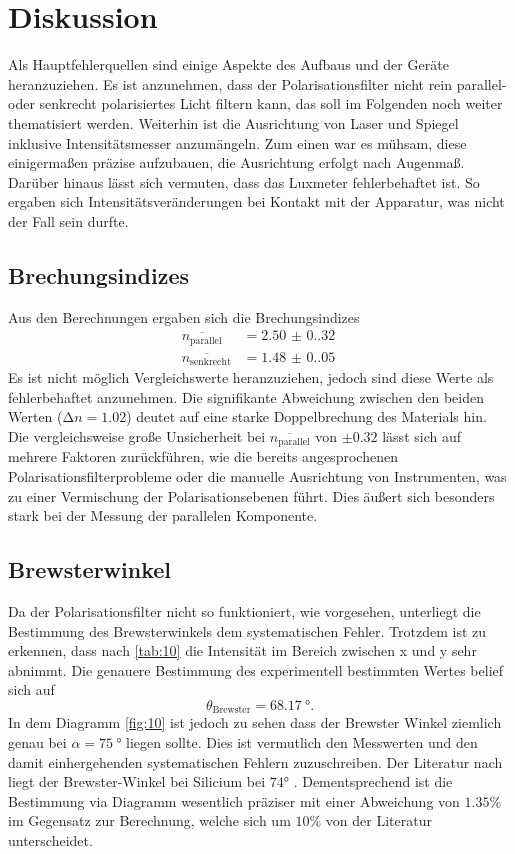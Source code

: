 \section{Diskussion}
\label{sec:Diskussion}

Als Hauptfehlerquellen sind einige Aspekte des Aufbaus und der Geräte heranzuziehen.
Es ist anzunehmen, dass der Polarisationsfilter nicht rein parallel- oder 
senkrecht polarisiertes Licht filtern kann, das soll im Folgenden noch weiter 
thematisiert werden. Weiterhin ist die Ausrichtung von Laser und Spiegel inklusive 
Intensitätsmesser anzumängeln. Zum einen war es mühsam, diese einigermaßen präzise 
aufzubauen, die Ausrichtung erfolgt nach Augenmaß. Darüber hinaus lässt sich 
vermuten, dass das Luxmeter fehlerbehaftet ist. So ergaben sich 
Intensitätsveränderungen bei Kontakt mit der Apparatur, was nicht der Fall sein 
durfte.

\subsection{Brechungsindizes}
Aus den Berechnungen ergaben sich die Brechungsindizes
\begin{align*}
    \overline{n_\text{parallel}}  &= \qty{2.50(0.32)}{} \\
    \overline{n_\text{senkrecht}} &= \qty{1.48(0.05)}{}
\end{align*}
\noindent Es ist nicht möglich Vergleichswerte heranzuziehen, jedoch sind diese 
Werte als fehlerbehaftet anzunehmen. Die signifikante Abweichung zwischen den
beiden Werten ($\increment n = 1.02$) deutet auf eine starke Doppelbrechung des
Materials hin. Die vergleichsweise große Unsicherheit bei $\overline{n_\text{parallel}}$
von $\pm 0.32$ lässt sich auf mehrere Faktoren zurückführen, wie die bereits 
angesprochenen Polarisationsfilterprobleme oder die manuelle Ausrichtung von 
Instrumenten, was zu einer Vermischung der Polarisationsebenen führt.
Dies äußert sich besonders stark bei der Messung der parallelen Komponente.

\subsection{Brewsterwinkel}
Da der Polarisationsfilter nicht so funktioniert, wie vorgesehen, unterliegt die
Bestimmung des Brewsterwinkels dem systematischen Fehler. Trotzdem ist zu erkennen, 
dass nach \autoref{tab:10} die Intensität im Bereich zwischen x und y 
sehr abnimmt. Die genauere Bestimmung des experimentell bestimmten Wertes 
belief sich auf
\begin{equation*}
    \theta_\text{Brewster} = \qty{68.17}{\degree}.
\end{equation*} 
\noindent In dem Diagramm \autoref{fig:10} ist jedoch zu sehen dass der Brewster Winkel ziemlich genau 
bei $\alpha = \qty{75}{\degree}$ liegen sollte. Dies ist vermutlich den Messwerten und den damit einhergehenden systematischen 
Fehlern zuzuschreiben. 
Der Literatur nach liegt der Brewster-Winkel bei Silicium bei $74°$ \cite{brewster}.
Dementsprechend ist die Bestimmung via Diagramm wesentlich präziser mit einer 
Abweichung von $1.35 \%$ im Gegensatz zur Berechnung, welche sich um $10 \%$
von der Literatur unterscheidet.

